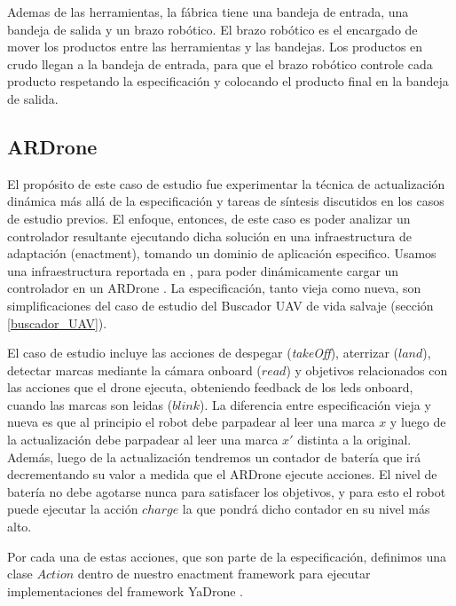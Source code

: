 Ademas de las herramientas, la fábrica tiene una bandeja de entrada, una bandeja de salida y un brazo robótico. El brazo
robótico es el encargado de mover los productos entre las herramientas y las bandejas. Los productos en crudo llegan a
la bandeja de entrada, para que el brazo robótico controle cada producto respetando la especificación y colocando el
producto final en la bandeja de salida.

\subsection{ARDrone}

El propósito de este caso de estudio fue experimentar la técnica de actualización dinámica más allá de la especificación
y tareas de síntesis discutidos en los casos de estudio previos. El enfoque, entonces, de este caso es poder analizar un
controlador resultante ejecutando dicha solución en una infraestructura de adaptación (enactment), tomando un dominio de
aplicación especifico. Usamos una infraestructura reportada en \cite{Braberman:2013:CSM:2486788.2487002}, para poder
dinámicamente cargar un controlador en un ARDrone \cite{ARDrone}. La especificación, tanto vieja como nueva, son
simplificaciones del caso de estudio del Buscador UAV de vida salvaje (sección \ref{buscador_UAV}). 

El caso de estudio incluye las acciones de despegar (\emph{takeOff}), aterrizar ($land$), detectar marcas mediante la cámara
onboard ($read$) y objetivos relacionados con las acciones que el drone ejecuta, obteniendo feedback de los leds
onboard, cuando las marcas son leidas ($blink$). La diferencia entre especificación vieja y nueva es que al principio el
robot debe parpadear al leer una marca $x$ y luego de la actualización debe parpadear al leer una marca $x'$ distinta a
la original. Además, luego de la actualización tendremos un contador de batería que irá decrementando su valor a medida
que el ARDrone ejecute acciones. El nivel de batería no debe agotarse nunca para satisfacer los objetivos, y para esto
el robot puede ejecutar la acción $charge$ la que pondrá dicho contador en su nivel más alto.

Por cada una de estas acciones, que son parte de la especificación, definimos una clase $Action$ dentro de nuestro
enactment framework para ejecutar implementaciones del framework YaDrone \cite{YaDrone}.



